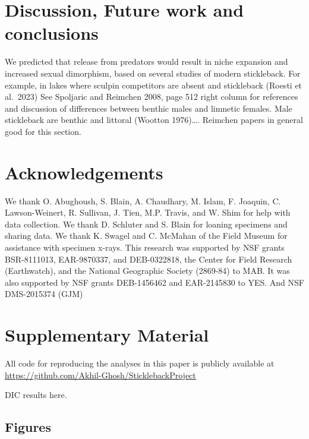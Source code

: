 \documentclass[
  12pt,
]{article}
\begin{document}
\hypertarget{sec:conclusions}{%
\section{Discussion, Future work and
conclusions}\label{sec:conclusions}}

We predicted that release from predators would result in niche expansion
and increased sexual dimorphism, based on several studies of modern
stickleback. For example, in lakes where sculpin competitors are absent
and stickleback (Roesti et al.~2023) See Spoljaric and Reimchen 2008,
page 512 right column for references and discussion of differences
between benthic males and limnetic females. Male stickleback are benthic
and littoral (Wootton 1976)\ldots. Reimchen papers in general good for
this section.

\hypertarget{acknowledgements}{%
\section*{Acknowledgements}\label{acknowledgements}}

We thank O. Abughoush, S. Blain, A. Chaudhary, M. Islam, F. Joaquin, C.
Lawson-Weinert, R. Sullivan, J. Tien, M.P. Travis, and W. Shim for help
with data collection. We thank D. Schluter and S. Blain for loaning
specimens and sharing data. We thank K. Swagel and C. McMahan of the
Field Museum for assistance with specimen x-rays. This research was
supported by NSF grants BSR-8111013, EAR-9870337, and DEB-0322818, the
Center for Field Research (Earthwatch), and the National Geographic
Society (2869-84) to MAB. It was also supported by NSF grants
DEB-1456462 and EAR-2145830 to YES. And NSF DMS-2015374 (GJM)

\hypertarget{supplementary-material}{%
\section*{Supplementary Material}\label{supplementary-material}}

All code for reproducing the analyses in this paper is publicly
available at \url{https://github.com/Akhil-Ghosh/SticklebackProject}

DIC results here.

\hypertarget{figures}{%
\subsection{Figures}\label{figures}}
\end{document}
